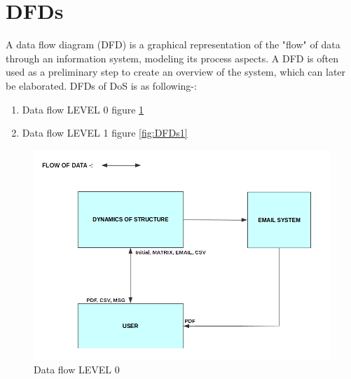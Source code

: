 \section{DFDs}
A data flow diagram (DFD) is a graphical representation of the "flow" of data through an information system, modeling its process aspects. A DFD is often used as a preliminary step to create an overview of the system, which can later be elaborated. DFDs of DoS is as following-:
\begin{enumerate}
\item Data flow LEVEL 0 figure \ref{fig:DFDs}
\item Data flow LEVEL 1 figure \ref{fig:DFDs1}
\end{enumerate}
\begin{figure}[H]
\centering \includegraphics[scale=0.4]{images/DFDS.png}
\caption{Data flow LEVEL 0}
\label{fig:DFDs}
\end{figure}
